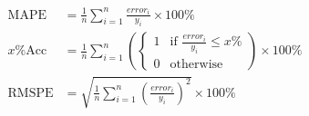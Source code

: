 \begin{align}
    \text{MAPE} &= \frac{1}{n}\sum_{i=1}^{n}\frac{error_i}{y_i}\times 100\% \\
    x\%\text{Acc} &= \frac{1}{n}\sum_{i=1}^{n}(\begin{cases} 
    1 & \text{if } \frac{{error}_i}{y_i} \leq x\% \\
    0 & \text{otherwise}
    \end{cases}) \times 100\% \\
    \text{RMSPE} &= \sqrt{\frac{1}{n}\sum_{i=1}^{n}\left(\frac{error_i}{y_i}\right)^2} \times 100\% \\
  \label{eq:metrics}
  \nonumber
\end{align}